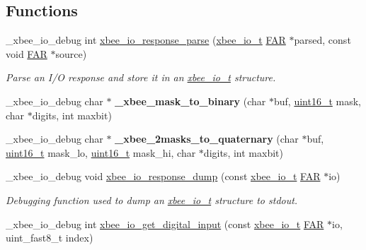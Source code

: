 \subsection*{Functions}
\begin{DoxyCompactItemize}
\item 
\+\_\+xbee\+\_\+io\+\_\+debug int \hyperlink{group__xbee__io_ga49aae35ec2a46306bf2ad593cecbcf26}{xbee\+\_\+io\+\_\+response\+\_\+parse} (\hyperlink{structxbee__io__t}{xbee\+\_\+io\+\_\+t} \hyperlink{group__hal_gaef060b3456fdcc093a7210a762d5f2ed}{F\+AR} $\ast$parsed, const void \hyperlink{group__hal_gaef060b3456fdcc093a7210a762d5f2ed}{F\+AR} $\ast$source)
\begin{DoxyCompactList}\small\item\em Parse an I/O response and store it in an \hyperlink{structxbee__io__t}{xbee\+\_\+io\+\_\+t} structure. \end{DoxyCompactList}\item 
\mbox{\label{group__xbee__io_ga973f925aa6983ad40f5e4fb2665d7e37}} 
\+\_\+xbee\+\_\+io\+\_\+debug char $\ast$ {\bfseries \+\_\+xbee\+\_\+mask\+\_\+to\+\_\+binary} (char $\ast$buf, \hyperlink{group__hal__dos_ga5a8b2dc9e45a9ee81a94ef304fb62505}{uint16\+\_\+t} mask, char $\ast$digits, int maxbit)
\item 
\mbox{\label{group__xbee__io_ga4d913c1fcbb1a2552babe3e6a86c22c7}} 
\+\_\+xbee\+\_\+io\+\_\+debug char $\ast$ {\bfseries \+\_\+xbee\+\_\+2masks\+\_\+to\+\_\+quaternary} (char $\ast$buf, \hyperlink{group__hal__dos_ga5a8b2dc9e45a9ee81a94ef304fb62505}{uint16\+\_\+t} mask\+\_\+lo, \hyperlink{group__hal__dos_ga5a8b2dc9e45a9ee81a94ef304fb62505}{uint16\+\_\+t} mask\+\_\+hi, char $\ast$digits, int maxbit)
\item 
\+\_\+xbee\+\_\+io\+\_\+debug void \hyperlink{group__xbee__io_ga931be802188e7f6d5f34ca8c47405479}{xbee\+\_\+io\+\_\+response\+\_\+dump} (const \hyperlink{structxbee__io__t}{xbee\+\_\+io\+\_\+t} \hyperlink{group__hal_gaef060b3456fdcc093a7210a762d5f2ed}{F\+AR} $\ast$io)
\begin{DoxyCompactList}\small\item\em Debugging function used to dump an \hyperlink{structxbee__io__t}{xbee\+\_\+io\+\_\+t} structure to stdout. \end{DoxyCompactList}\item 
\+\_\+xbee\+\_\+io\+\_\+debug int \hyperlink{group__xbee__io_gad542b5112bb7aafb9b3b9f965d6f3703}{xbee\+\_\+io\+\_\+get\+\_\+digital\+\_\+input} (const \hyperlink{structxbee__io__t}{xbee\+\_\+io\+\_\+t} \hyperlink{group__hal_gaef060b3456fdcc093a7210a762d5f2ed}{F\+AR} $\ast$io, uint\+\_\+fast8\+\_\+t index)

\end{DoxyCompactItemize}
